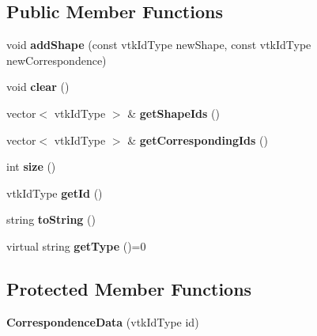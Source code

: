 \subsection*{Public Member Functions}
\begin{DoxyCompactItemize}
\item 
\hypertarget{class_correspondence_data_abdf278997d70f654647ab521589733f8}{}void {\bfseries add\+Shape} (const vtk\+Id\+Type new\+Shape, const vtk\+Id\+Type new\+Correspondence)\label{class_correspondence_data_abdf278997d70f654647ab521589733f8}

\item 
\hypertarget{class_correspondence_data_a4bce18620695e23262206e7e1f8a860f}{}void {\bfseries clear} ()\label{class_correspondence_data_a4bce18620695e23262206e7e1f8a860f}

\item 
\hypertarget{class_correspondence_data_a094039b5f79ff82898d7a940b98203fe}{}vector$<$ vtk\+Id\+Type $>$ \& {\bfseries get\+Shape\+Ids} ()\label{class_correspondence_data_a094039b5f79ff82898d7a940b98203fe}

\item 
\hypertarget{class_correspondence_data_a8b5c45708c2ca5e7a8671de9a7f9f635}{}vector$<$ vtk\+Id\+Type $>$ \& {\bfseries get\+Corresponding\+Ids} ()\label{class_correspondence_data_a8b5c45708c2ca5e7a8671de9a7f9f635}

\item 
\hypertarget{class_correspondence_data_ad6746b995840c277e0a0b2c0ae0afe81}{}int {\bfseries size} ()\label{class_correspondence_data_ad6746b995840c277e0a0b2c0ae0afe81}

\item 
\hypertarget{class_correspondence_data_a990fb28e8aa665c9aa7c77b17b1ba64c}{}vtk\+Id\+Type {\bfseries get\+Id} ()\label{class_correspondence_data_a990fb28e8aa665c9aa7c77b17b1ba64c}

\item 
\hypertarget{class_correspondence_data_ab374d531599a7bf59e262191263dc147}{}string {\bfseries to\+String} ()\label{class_correspondence_data_ab374d531599a7bf59e262191263dc147}

\item 
\hypertarget{class_correspondence_data_a060f3788975ef1c3129114f191c41650}{}virtual string {\bfseries get\+Type} ()=0\label{class_correspondence_data_a060f3788975ef1c3129114f191c41650}

\end{DoxyCompactItemize}
\subsection*{Protected Member Functions}
\begin{DoxyCompactItemize}
\item 
\hypertarget{class_correspondence_data_a07e83374f490dc9039396a31561bd32a}{}{\bfseries Correspondence\+Data} (vtk\+Id\+Type id)\label{class_correspondence_data_a07e83374f490dc9039396a31561bd32a}

\end{DoxyCompactItemize}
